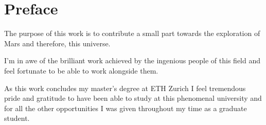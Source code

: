 \chapter*{Preface}

The purpose of this work is to contribute a small part towards the exploration of Mars and therefore, this universe. 

I'm in awe of the brilliant work achieved by the ingenious people of this field and feel fortunate to be able to work alongside them.

As this work concludes my master's degree at ETH Zurich I feel tremendous pride and gratitude to have been able to study at this phenomenal university and for all the other opportunities I was given throughout my time as a graduate student.